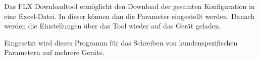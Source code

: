 Das FLX Downloadtool ermöglicht den Download der gesamten Konfiguration in eine Excel-Datei. In dieser können dan die Parameter eingestellt werden. Danach werden die Einstellungen über das Tool wieder auf das Gerät geladen.

Eingesetzt wird dieses Programm für das Schreiben von kundenspezifischen Parametern auf mehrere Geräte.
